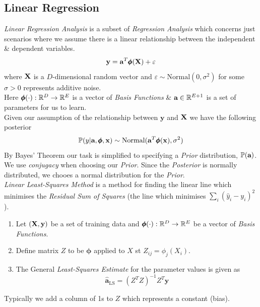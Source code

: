 \documentclass[11pt,a4paper]{article}
\begin{document}
\subsection{Linear Regression}

\textit{Linear Regression Analysis} is a subset of \textit{Regression Analysis} which concerns just scenarios where we assume there is a linear relationship between the independent \& dependent variables.
$$\textbf{y}=\textbf{a}^T\pmb\phi(\textbf{X})+\varepsilon$$
where $\textbf{X}$ is a $D$-dimensional random vector and $\varepsilon\sim\text{Normal}(0,\sigma^2)$ for some $\sigma>0$ represents additive noise.\\
Here $\pmb\phi(\cdot):\mathbb{R}^D\to\mathbb{R}^E$ is a vector of \textit{Basis Functions} \& $\textbf{a}\in\mathbb{R}^{E+1}$ is a set of parameters for us to learn.\\

Given our assumption of the relationship between $\textbf{y}$ and $\textbf{X}$ we have the following posterior
$$\mathbb{P}(y|\textbf{a},\pmb\phi,\textbf{x})\sim\text{Normal}(\textbf{a}^T\pmb\phi(\textbf{x}),\sigma^2)$$
By Bayes' Theorem our task is simplified to specifying a \textit{Prior} distribution, $\mathbb{P}(\textbf{a})$.\\

We use \textit{conjugacy} when choosing our \textit{Prior}. Since the \textit{Posterior} is normally distributed, we chooes a normal distribution for the \textit{Prior}.\\

\textit{Linear Least-Squares Method} is a method for finding the linear line which minimises the \textit{Residual Sum of Squares} (\ie the line which minimises $\sum_i(\hat{y}_i-y_i)^2$).
\begin{enumerate}
	\item Let $(\textbf{X},\textbf{y})$ be a set of training data and $\pmb\phi(\cdot):\mathbb{R}^D\to\mathbb{R}^E$ be a vector of \textit{Basis Functions}.
	\item Define matrix $Z$ to be $\pmb\phi$ applied to $X$ st $Z_{ij}=\phi_j(X_i)$.
	\item The General \textit{Least-Squares Estimate} for the parameter values is given as
	$$\hat{\textbf{a}}_\text{LS}=(Z^TZ)^{-1}Z^T\textbf{y}$$
\end{enumerate}
\nb Typically we add a column of 1s to $Z$ which represents a constant (\ie bias).\\
\end{document}
